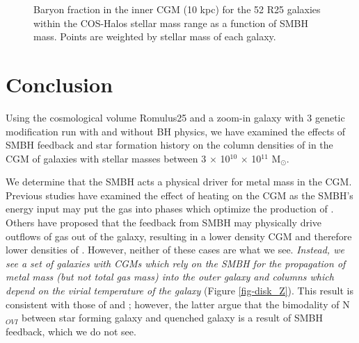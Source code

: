 \documentclass[]{emulateapj}
\begin{document}
\begin{figure}[ht!]
\vspace{-3mm}
\centerline{}
\caption[]{Baryon fraction in the inner CGM (10  kpc) for the 52 R25 galaxies within the COS-Halos stellar mass range as a function of SMBH mass. Points are weighted by stellar mass of each galaxy.}
\label{fig-BHmass}
\end{figure}

\section{Conclusion}
\label{sec-conclude}

Using the cosmological volume {\sc Romulus25} and a zoom-in galaxy with 3 genetic modification run with and without BH physics, we have examined the effects of SMBH feedback and star formation history on the column densities of  in the CGM of galaxies with stellar masses between 3 $\times$ 10$^{10}$  $\times$ 10$^{11}$ M$_{\odot}$.

We determine that the SMBH acts a physical driver for metal mass in the CGM. Previous studies have examined the effect of heating on the CGM as the SMBH's energy input may put the gas into phases which optimize the production of  \citep{Suresh2017}.  Others have proposed that the feedback from SMBH may physically drive outflows of gas out of the galaxy, resulting in a lower density CGM and therefore lower densities of  \citep{McQuinn2017,Mathews2017}. However, neither of these cases are what we see. \textit{Instead, we see a set of galaxies with CGMs which rely on the SMBH for the propagation of metal mass (but not total gas mass) into the outer galaxy and  columns which depend on the virial temperature of the galaxy} (Figure \ref{fig-disk_Z}). This result is consistent with those of \cite{Oppenheimer2016} and \cite{Nelson2018}; however, the latter argue that the bimodality of N$_{OVI}$ between star forming galaxy and quenched galaxy is a result of SMBH feedback, which we do not see.
\end{document}
